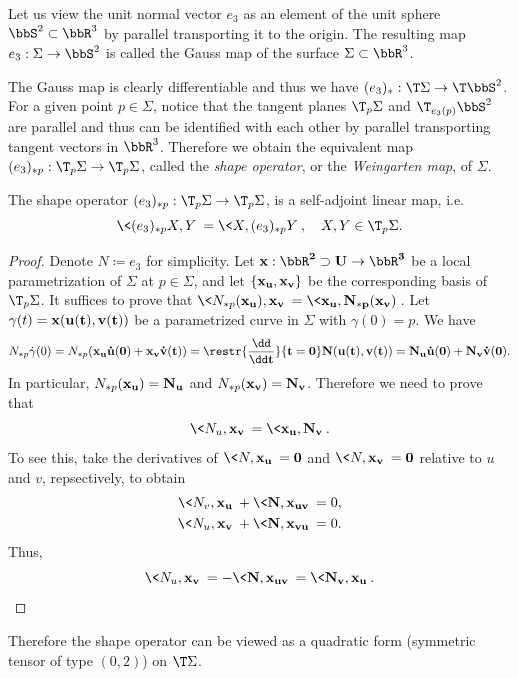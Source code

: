 \begin{defn}
    Let us view the unit normal vector $e_3$ as an element of the unit sphere $\bbS^2\subset\bbR^3$ by parallel transporting it to the origin. The resulting map $e_3:\Sigma\to \bbS^2$ is called the Gauss map of the surface $\Sigma\subset \bbR^3$.
\end{defn}

The Gauss map is clearly differentiable and thus we have $(e_3)_\ast:\T\Sigma\to \T\bbS^2$. For a given point $p\in\Sigma$, notice that the tangent planes $\T_p\Sigma$ and $\T_{e_3(p)}\bbS^2$ are parallel and thus can be identified with each other by parallel transporting tangent vectors in $\bbR^3$. Therefore we obtain the equivalent map $(e_3)_{\ast p}:\T_p\Sigma\to \T_p\Sigma$, called the \emph{shape operator}, or the \emph{Weingarten map}, of $\Sigma$.

\begin{lem}
    The shape operator $(e_3)_{\ast p}:\T_p\Sigma\to \T_p\Sigma$, is a self-adjoint linear map, i.e.\ 
    \[\<(e_3)_{\ast p}X,Y\>=\<X,(e_3)_{\ast p}Y\>,\quad X,Y\in \T_p\Sigma.\]
\end{lem}
\begin{proof}
    Denote $N\coloneqq e_3$ for simplicity. Let $\bf{x}:\bbR^2\supset U\to \bbR^3$ be a local parametrization of $\Sigma$ at $p\in\Sigma$, and let $\{\bf{x}_u, \bf{x}_v\}$ be the corresponding basis of $\T_p\Sigma$. It suffices to prove that $\<N_{\ast p}(\bf{x}_u),\bf{x}_v\>=\<\bf{x}_u,N_{\ast p}(\bf{x}_v)\>$. Let $\gamma(t)=\bf{x}(u(t),v(t))$ be a parametrized curve in $\Sigma$ with $\gamma(0)=p$. We have 
    \[N_{\ast p}\dot\gamma(0)=N_{\ast p}(\bf{x}_u \dot u(0)+\bf{x}_v \dot v(t))=\restr{\frac{\dd}{\dd t}}{t=0}N(u(t),v(t))=N_u \dot u(0)+N_v\dot v(0).\]
    In particular, $N_{\ast p}(\bf{x}_u)=N_u$ and $N_{\ast p}(\bf{x}_v)=N_v$. Therefore we need to prove that 
    \[\<N_u,\bf{x}_v\>=\<\bf{x}_u,N_v\>.\]
    To see this, take the derivatives of $\<N,\bf{x}_u\>=0$ and $\<N,\bf{x}_v\>=0$ relative to $u$ and $v$, repsectively, to obtain 
    \begin{align}
        \<N_v,\bf{x}_u\>+\<N,\bf{x}_{uv}\>&=0,\\
        \<N_u,\bf{x}_v\>+\<N,\bf{x}_{vu}\>&=0.
    \end{align}
    Thus, 
    \[\<N_u,\bf{x}_v\>=-\<N,\bf{x}_{uv}\>=\<N_v,\bf{x}_u\>.\]
\end{proof}

Therefore the shape operator can be viewed as a quadratic form (symmetric tensor of type $(0,2)$) on $\T\Sigma$.

